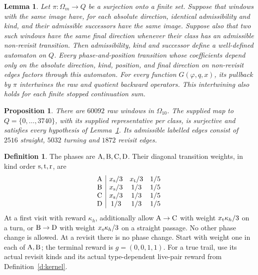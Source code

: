 \documentclass[11pt,reqno]{amsart}
\newtheorem{lemma}[theorem]{Lemma}
\newtheorem{proposition}[theorem]{Proposition}
\theoremstyle{definition}
\newtheorem{definition}[theorem]{Definition}
\theoremstyle{remark}
\begin{document}
\begin{lemma}\label{l:automaton-quotient}
Let \(\pi:\Omega_m\to Q\) be a surjection onto a finite set.
Suppose that windows with the same image have, for each absolute
direction, identical admissibility and kind, and their admissible
successors have the same image. Suppose also that two such windows
have the same final direction whenever their class has an admissible
non-revisit transition.
Then admissibility, kind and successor define a well-defined automaton
on \(Q\). Every phase-and-position transition whose coefficients
depend only on the absolute direction, kind, position, and final
direction on non-revisit edges factors through this automaton.
For every function \(G(\varphi,q,x)\), its pullback by \(\pi\)
intertwines the raw and quotient backward operators. This
intertwining also holds for each finite stopped continuation sum.
\end{lemma}

\begin{proposition}\label{p:automaton10}
There are \(60092\) raw windows in \(\Omega_{10}\).
The supplied map to \(Q=\{0,\ldots,3740\}\), with its supplied
representative per class, is surjective and satisfies every
hypothesis of Lemma~\ref{l:automaton-quotient}.
Its admissible labelled edges consist of \(2516\) straight,
\(5032\) turning and \(1872\) revisit edges.
\end{proposition}

\begin{definition}\label{d:phaseweights}
The phases are \({\rm A},{\rm B},{\rm C},{\rm D}\). Their
diagonal transition weights, in kind order \({\rm s},{\rm t},{\rm r}\), are
\[
 \begin{array}{c|ccc}
 {\rm A}&x_{\rm s}/3&x_{\rm t}/3&1/5\\
 {\rm B}&x_{\rm s}/3&1/3&1/5\\
 {\rm C}&x_{\rm s}/3&1/3&1/5\\
 {\rm D}&1/3&1/3&1/5
 \end{array}
\]
At a first visit with reward \(\kappa_h\), additionally allow
\({\rm A}\to{\rm C}\) with weight \(x_{\rm t}\kappa_h/3\) on a turn,
or \({\rm B}\to{\rm D}\) with weight \(x_{\rm s}\kappa_h/3\)
on a straight passage. No other phase change is allowed.
At a revisit there is no phase change.
Start with weight one in each of \({\rm A},{\rm B}\);
the terminal reward is \(g=(0,0,1,1)\).
For a true trail, use its actual revisit kinds and its actual
type-dependent live-pair reward from Definition~\ref{d:kernel}.
\end{definition}
\end{document}
